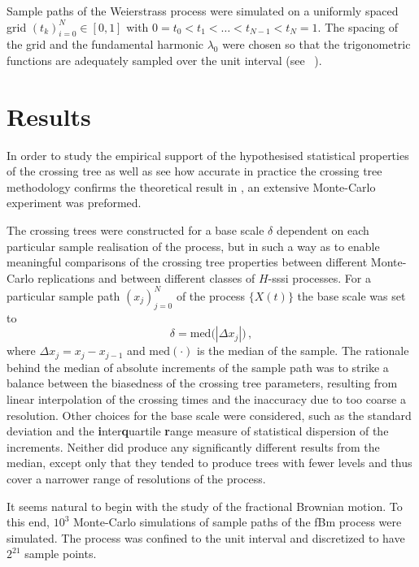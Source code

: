 \documentclass[a4paper]{article}
\begin{document}
Sample paths of the Weierstrass process were simulated on a uniformly spaced grid
$(t_k)_{i=0}^N\in [0,1]$ with $0 = t_0< t_1 < \ldots < t_{N-1} < t_N = 1$. The spacing
of the grid and the fundamental harmonic $\lambda_0$ were chosen so that the trigonometric
functions are adequately sampled over the unit interval (see ~\cite{decrouez2013estimation}).



\section{Results} %
\label{sec:results}

In order to study the empirical support of the hypothesised statistical properties of
the crossing tree as well as see how accurate in practice the crossing tree methodology
confirms the theoretical result in \cite{ECP1673}, an extensive Monte-Carlo experiment
was preformed.

The crossing trees were constructed for a base scale $\delta$ dependent on each particular
sample realisation of the process, but in such a way as to enable meaningful comparisons
of the crossing tree properties between different Monte-Carlo replications and between
different classes of $H$-sssi processes. For a particular sample path $(x_j)_{j=0}^N$
of the process $\{X(t)\}$ the base scale was set to
\[ \delta = \text{med}\bigl( |\Delta x_j| \bigr) \,, \]
where $\Delta x_j = x_j - x_{j-1}$ and $\text{med}(\cdot)$ is the median of the
sample. The rationale behind the median of absolute increments of the sample path
was to strike a balance between the biasedness of the crossing tree parameters,
resulting from linear interpolation of the crossing times and the inaccuracy due to
too coarse a resolution. Other choices for the base scale were considered, such
as the standard deviation and the \textbf{i}nter\textbf{q}uartile \textbf{r}ange
measure of statistical dispersion of the increments. Neither did produce any significantly
different results from the median, except only that they tended to produce trees with
fewer levels and thus cover a narrower range of resolutions of the process.

It seems natural to begin with the study of the fractional Brownian motion. To this end,
$10^3$ Monte-Carlo simulations of sample paths of the fBm process were simulated. The
process was confined to the unit interval and discretized to have $2^{21}$ sample points.
\end{document}
